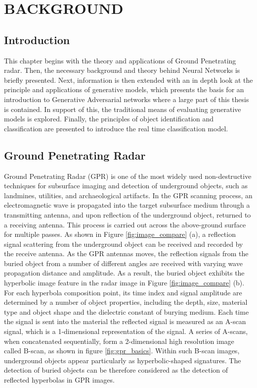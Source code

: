 \doublespacing
\chapter{BACKGROUND}


\section{Introduction}
This chapter begins with the theory and applications of Ground Penetrating radar. Then, the necessary background and theory behind Neural Networks is briefly presented. Next, information is then extended with an in depth look at the principle and applications of generative models, which presents the basis for an introduction to Generative Adversarial networks where a large part of this thesis is contained. In support of this, the traditional means of evaluating generative models is explored. Finally, the principles of object identification and classification are presented to introduce the real time classification model. 

\section{Ground Penetrating Radar}\label{GPR Backround}
Ground Penetrating Radar (GPR) is one of the most widely used non-destructive techniques for subsurface imaging and detection of underground objects, such as landmines, utilities, and archaeological artifacts. In the GPR scanning process, an electromagnetic wave is propagated into the target subsurface medium through a transmitting antenna, and upon reflection of the underground object, returned to a receiving antenna. This process is carried out across the above-ground surface for multiple passes. As shown in Figure \ref{fig:image_compare} (a), a reflection signal scattering from the underground object can be received and recorded by the receive antenna. As the GPR antennas moves, the reflection signals from the buried object from a number of different angles are received with varying wave propagation distance and amplitude. As a result, the buried object exhibits the hyperbolic image feature in the radar image in Figure \ref{fig:image_compare} (b). For each hyperbola composition point, its time index and signal amplitude are determined by a number of object properties, including the depth, size, material type and object shape and the dielectric constant of burying medium. Each time the signal is sent into the material the reflected signal is measured as an A-scan signal, which is a 1-dimensional representation of the signal. A series of A-scans, when concatenated sequentially, form a 2-dimensional high resolution image called B-scan, as shown in figure \ref{fig:gpr_basics}. Within such B-scan images, underground objects appear particularly as hyperbolic-shaped signatures. The detection of buried objects can be therefore considered as the detection of reflected hyperbolas in GPR images.


